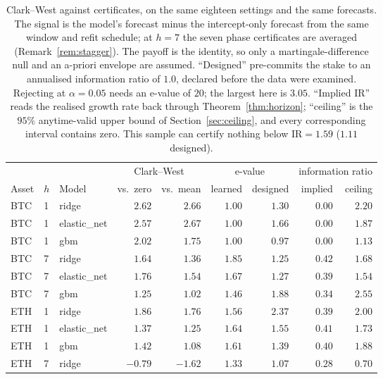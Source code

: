 \documentclass{article}
\theoremstyle{plain}
\theoremstyle{definition}
\begin{document}
\begin{table}[t]
  \centering
  \caption{Clark--West against certificates, on the same eighteen settings and the same
  forecasts. The signal is the model's forecast minus the intercept-only forecast from the
  same window and refit schedule; at $h=7$ the seven phase certificates are averaged
  (Remark~\ref{rem:stagger}). The payoff is the identity, so only a
  martingale-difference null and an a-priori envelope are assumed. ``Designed'' pre-commits
  the stake to an annualised information ratio of $1.0$, declared before the data were
  examined. Rejecting at $\alpha=0.05$ needs an e-value of $20$; the largest here is $3.05$. ``Implied
  $\mathrm{IR}$'' reads the realised growth rate back through
  Theorem~\ref{thm:horizon}; ``ceiling'' is the $95\%$ anytime-valid upper bound of
  Section~\ref{sec:ceiling}, and every corresponding interval contains zero. This sample can
  certify nothing below $\mathrm{IR}=1.59$ ($1.11$ designed).}
  \label{tab:cert}
  \small
  \begin{tabular}{lllrrrrrr}
    \toprule
    & & & \multicolumn{2}{c}{Clark--West} & \multicolumn{2}{c}{e-value}
    & \multicolumn{2}{c}{information ratio} \\
    \cmidrule(lr){4-5}\cmidrule(lr){6-7}\cmidrule(lr){8-9}
    Asset & $h$ & Model & vs.\ zero & vs.\ mean & learned & designed & implied & ceiling \\
    \midrule
    BTC & 1 & ridge & $2.62$ & $2.66$ & $1.00$ & $1.30$ & $0.00$ & $2.20$ \\
    BTC & 1 & elastic\_net & $2.57$ & $2.67$ & $1.00$ & $1.66$ & $0.00$ & $1.87$ \\
    BTC & 1 & gbm & $2.02$ & $1.75$ & $1.00$ & $0.97$ & $0.00$ & $1.13$ \\
    BTC & 7 & ridge & $1.64$ & $1.36$ & $1.85$ & $1.25$ & $0.42$ & $1.68$ \\
    BTC & 7 & elastic\_net & $1.76$ & $1.54$ & $1.67$ & $1.27$ & $0.39$ & $1.54$ \\
    BTC & 7 & gbm & $1.25$ & $1.02$ & $1.46$ & $1.88$ & $0.34$ & $2.55$ \\
    ETH & 1 & ridge & $1.86$ & $1.76$ & $1.56$ & $2.37$ & $0.39$ & $2.00$ \\
    ETH & 1 & elastic\_net & $1.37$ & $1.25$ & $1.64$ & $1.55$ & $0.41$ & $1.73$ \\
    ETH & 1 & gbm & $1.42$ & $1.08$ & $1.61$ & $1.39$ & $0.40$ & $1.88$ \\
    ETH & 7 & ridge & $-0.79$ & $-1.62$ & $1.33$ & $1.07$ & $0.28$ & $0.70$ \\

\end{tabular}
\end{table}
\end{document}
